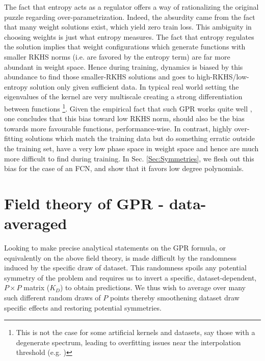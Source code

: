 The fact that entropy acts as a regulator offers a way of rationalizing the original puzzle regarding over-parametrization. Indeed, the absurdity came from the fact that many weight solutions exist, which yield zero train loss. This ambiguity in choosing weights is just what entropy measures. The fact that entropy regulates the solution implies that weight configurations which generate functions with smaller RKHS norms (i.e. are favored by the entropy term) are far more abundant in weight space. Hence during training, dynamics is biased by this abundance to find those smaller-RKHS solutions and goes to high-RKHS/low-entropy solution only given sufficient data. In typical real world setting the eigenvalues of the kernel are very multiscale creating a strong differentiation between functions \footnote{This is not the case for some artificial kernels and datasets, say those with a degenerate spectrum, leading to overfitting issues near the interpolation threshold (e.g. \cite{Canatar2021})}. Given the empirical fact that such GPR works quite well \citep{lee2019wide}, one concludes that this bias toward low RKHS norm, should also be the bias towards more favourable functions, performance-wise. In contrast, highly over-fitting solutions which match the training data but do something erratic outside the training set, have a very low phase space in weight space and hence are much more difficult to find during training. In Sec. \ref{Sec:Symmetries}, we flesh out this bias for the case of an FCN, and show that it favors low degree polynomials. 

\section{Field theory of GPR - data-averaged}
\label{Sec:AveragedGPR}
Looking to make precise analytical statements on the GPR formula, or equivalently on the above field theory, is made difficult by the randomness induced by the specific draw of dataset. This randomness spoils any potential symmetry of the problem and requires us to invert a specific, dataset-dependent, $P\times P$ matrix ($K_D$) to obtain predictions. We thus wish to average over many such different random draws of $P$ points thereby smoothening dataset draw specific effects and restoring potential symmetries.  

